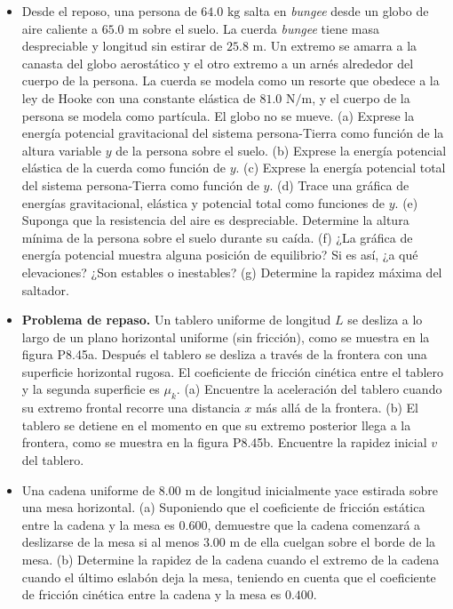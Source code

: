 \documentclass[11pt,a4paper]{article}
\begin{document}
\newpage

\begin{itemize}
    \item[\textbf{44.}] Desde el reposo, una persona de $64.0 \text{ kg}$ salta en \textit{bungee} desde un globo de aire caliente a $65.0 \text{ m}$ sobre el suelo. La cuerda \textit{bungee} tiene masa despreciable y longitud sin estirar de $25.8 \text{ m}$. Un extremo se amarra a la canasta del globo aerostático y el otro extremo a un arnés alrededor del cuerpo de la persona. La cuerda se modela como un resorte que obedece a la ley de Hooke con una constante elástica de $81.0 \text{ N/m}$, y el cuerpo de la persona se modela como partícula. El globo no se mueve. (a) Exprese la energía potencial gravitacional del sistema persona-Tierra como función de la altura variable $y$ de la persona sobre el suelo. (b) Exprese la energía potencial elástica de la cuerda como función de $y$. (c) Exprese la energía potencial total del sistema persona-Tierra como función de $y$. (d) Trace una gráfica de energías gravitacional, elástica y potencial total como funciones de $y$. (e) Suponga que la resistencia del aire es despreciable. Determine la altura mínima de la persona sobre el suelo durante su caída. (f) ¿La gráfica de energía potencial muestra alguna posición de equilibrio? Si es así, ¿a qué elevaciones? ¿Son estables o inestables? (g) Determine la rapidez máxima del saltador.
    \vspace*{9cm}

    \item[\textbf{45.}] \textbf{Problema de repaso.} Un tablero uniforme de longitud $L$ se desliza a lo largo de un plano horizontal uniforme (sin fricción), como se muestra en la figura P8.45a. Después el tablero se desliza a través de la frontera con una superficie horizontal rugosa. El coeficiente de fricción cinética entre el tablero y la segunda superficie es $\mu_k$. (a) Encuentre la aceleración del tablero cuando su extremo frontal recorre una distancia $x$ más allá de la frontera. (b) El tablero se detiene en el momento en que su extremo posterior llega a la frontera, como se muestra en la figura P8.45b. Encuentre la rapidez inicial $v$ del tablero.
    \vspace*{6cm}

    \item[\textbf{46.}] Una cadena uniforme de $8.00 \text{ m}$ de longitud inicialmente yace estirada sobre una mesa horizontal. (a) Suponiendo que el coeficiente de fricción estática entre la cadena y la mesa es $0.600$, demuestre que la cadena comenzará a deslizarse de la mesa si al menos $3.00 \text{ m}$ de ella cuelgan sobre el borde de la mesa. (b) Determine la rapidez de la cadena cuando el extremo de la cadena cuando el último eslabón deja la mesa, teniendo en cuenta que el coeficiente de fricción cinética entre la cadena y la mesa es $0.400$.
    \vspace*{7cm}


\end{itemize}
\end{document}
